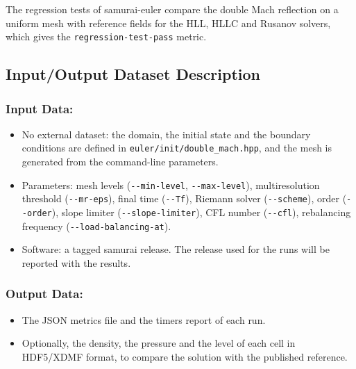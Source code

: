 The regression tests of samurai-euler compare the double Mach reflection on a
uniform mesh with reference fields for the HLL, HLLC and Rusanov solvers, which
gives the \texttt{regression-test-pass} metric.




\subsection{Input/Output Dataset Description}


\subsubsection{Input Data:}
  \begin{itemize}
  \item No external dataset: the domain, the initial state and the boundary
    conditions are defined in \texttt{euler/init/double\_mach.hpp}, and the
    mesh is generated from the command-line parameters.
  \item Parameters: mesh levels (\texttt{-{}-min-level}, \texttt{-{}-max-level}),
    multiresolution threshold (\texttt{-{}-mr-eps}), final time (\texttt{-{}-Tf}),
    Riemann solver (\texttt{-{}-scheme}), order (\texttt{-{}-order}), slope limiter
    (\texttt{-{}-slope-limiter}), CFL number (\texttt{-{}-cfl}), rebalancing
    frequency (\texttt{-{}-load-balancing-at}).
  \item Software: a tagged samurai release. The release used for the runs
    will be reported with the results.
  \end{itemize}

\subsubsection{Output Data:}
  \begin{itemize}
  \item The JSON metrics file and the timers report of each run.
  \item Optionally, the density, the pressure and the level of each cell in
    HDF5/XDMF format, to compare the solution with the published reference.
  \end{itemize}




